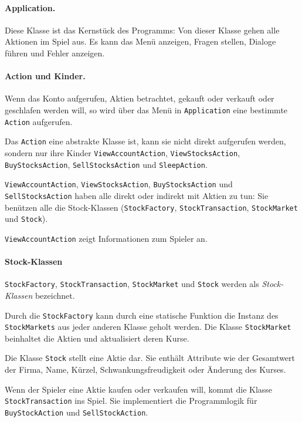 \documentclass[paper=a4, fontsize=11pt]{article}
\numberwithin{equation}{section}		%
\numberwithin{figure}{section}			%
\numberwithin{table}{section}				%
\begin{document}
	\paragraph{Application.} Diese Klasse ist das Kernstück des Programms: Von dieser Klasse gehen alle Aktionen im Spiel aus. Es kann das Menü anzeigen, Fragen stellen, Dialoge führen und Fehler anzeigen.
	
	\paragraph{Action und Kinder.} Wenn das Konto aufgerufen, Aktien betrachtet, gekauft oder verkauft oder geschlafen werden will, so wird über das Menü in \texttt{Application} eine bestimmte \texttt{Action} aufgerufen.
	
	Das \texttt{Action} eine abstrakte Klasse ist, kann sie nicht direkt aufgerufen werden, sondern nur ihre Kinder \texttt{ViewAccountAction}, \texttt{ViewStocksAction}, \texttt{BuyStocksAction}, \texttt{SellStocksAction} und \texttt{SleepAction}. 
	
	\texttt{ViewAccountAction}, \texttt{ViewStocksAction}, \texttt{BuyStocksAction} und \texttt{SellStocksAction} haben alle direkt oder indirekt mit Aktien zu tun: Sie benützen alle die Stock-Klassen (\texttt{StockFactory}, \texttt{StockTransaction}, \texttt{StockMarket} und \texttt{Stock}).
	
	\texttt{ViewAccountAction} zeigt Informationen zum Spieler an.
	
	\paragraph{Stock-Klassen}
	
	\texttt{StockFactory}, \texttt{StockTransaction}, \texttt{StockMarket} und \texttt{Stock} werden als \textit{Stock-Klassen} bezeichnet.
	
	Durch die \texttt{StockFactory} kann durch eine statische Funktion die Instanz des \texttt{StockMarkets} aus jeder anderen Klasse geholt werden. Die Klasse \texttt{StockMarket} beinhaltet die Aktien und aktualisiert deren Kurse.
	
	Die Klasse \texttt{Stock} stellt eine Aktie dar. Sie enthält Attribute wie der Gesamtwert der Firma, Name, Kürzel, Schwankungsfreudigkeit oder Änderung des Kurses.
	
	Wenn der Spieler eine Aktie kaufen oder verkaufen will, kommt die Klasse \texttt{StockTransaction} ins Spiel. Sie implementiert die Programmlogik für \texttt{BuyStockAction} und \texttt{SellStockAction}.
	
\end{document}
